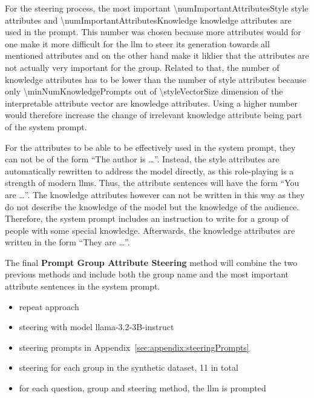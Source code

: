 For the steering process, the most important \num{\numImportantAttributesStyle} style attributes and \num{\numImportantAttributesKnowledge} knowledge attributes are used in the prompt. This number was chosen because more attributes would for one make it more difficult for the \ac{llm} to steer its generation towards all mentioned attributes and on the other hand make it liklier that the attributes are not actually very important for the group. Related to that, the number of knowledge attributes has to be lower than the number of style attributes because only \num{\minNumKnowledgePrompts} out of \num{\styleVectorSize} dimension of the interpretable attribute vector are knowledge attributes. Using a higher number would therefore increase the change of irrelevant knowledge attribute being part of the system prompt.

For the attributes to be able to be effectively used in the system prompt, they can not be of the form \enquote{The author is \ldots}. Instead, the style attributes are automatically rewritten to address the model directly, as this role-playing is a strength of modern \aclp{llm}. %
Thus, the attribute sentences will have the form \enquote{You are \ldots}.
The knowledge attributes however can not be written in this way as they do not describe the knowledge of the model but the knowledge of the audience. Therefore, the system prompt includes an instruction to write for a group of people with some special knowledge. Afterwards, the knowledge attributes are written in the form \enquote{They are \ldots}.

The final \textbf{Prompt Group Attribute Steering} method will combine the two previous methods and include both the group name and the most important attribute sentences in the system prompt.

\begin{itemize}
  \item repeat approach
  \item steering with model llama-3.2-3B-instruct
  \item steering prompts in Appendix~\ref{sec:appendix:steeringPrompts}
  \item steering for each group in the synthetic dataset, \num{11} in total
  \item for each question, group and steering method, the \ac{llm} is prompted
\end{itemize}

